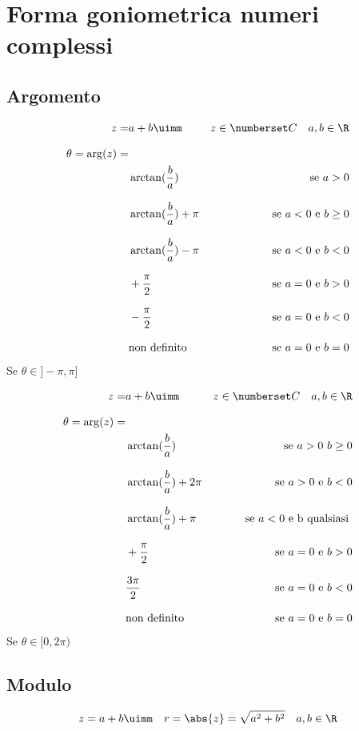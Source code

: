 \chapter{Forma goniometrica numeri complessi}
\section{Argomento}
\begin{align*}
z=&a+b\uimm& z\in\Co\quad a,b\in\R\\[8pt]
\theta=\arg(z)=&\\
&\arctan(\dfrac{b}{a})&\text{se}\ a>0 \\[8pt]
&\arctan(\dfrac{b}{a})+\pi&\text{se}\ a<0 \ \text{e} \ b\geq0\\[8pt]
&\arctan(\dfrac{b}{a})-\pi&\text{se}\ a<0\ \text{e} \ b<0\\[8pt]
&+\dfrac{\pi}{2}&\text{se}\ a=0 \ \text{e} \ b>0\\[8pt]
&-\dfrac{\pi}{2}&\text{se}\ a=0 \ \text{e} \ b<0\\[8pt]
&\text{non definito}&\text{se}\ a=0 \ \text{e} \ b=0
\end{align*}
Se $\theta\in]-\pi,\pi]$

\begin{align*}
z=&a+b\uimm& z\in\Co\quad a,b\in\R\\[8pt]
\theta=\arg(z)=&\\
&\arctan(\dfrac{b}{a})&\text{se}\ a>0\ b\geq 0 \\[8pt]
&\arctan(\dfrac{b}{a})+2\pi&\text{se}\ a>0 \ \text{e} \ b<0\\[8pt]
&\arctan(\dfrac{b}{a})+\pi&\text{se}\ a<0\ \text{e b qualsiasi} \ \\[8pt]
&+\dfrac{\pi}{2}&\text{se}\ a=0 \ \text{e} \ b>0\\[8pt]
&\dfrac{3\pi}{2}&\text{se}\ a=0 \ \text{e} \ b<0\\[8pt]
&\text{non definito}&\text{se}\ a=0 \ \text{e} \ b=0
\end{align*}
Se $\theta\in[0,2\pi)$
 \section{Modulo}
\begin{equation}
z=a+b\uimm\quad r=\abs{z}=\sqrt{a^2+b^2}\quad a,b\in\R
\end{equation}
